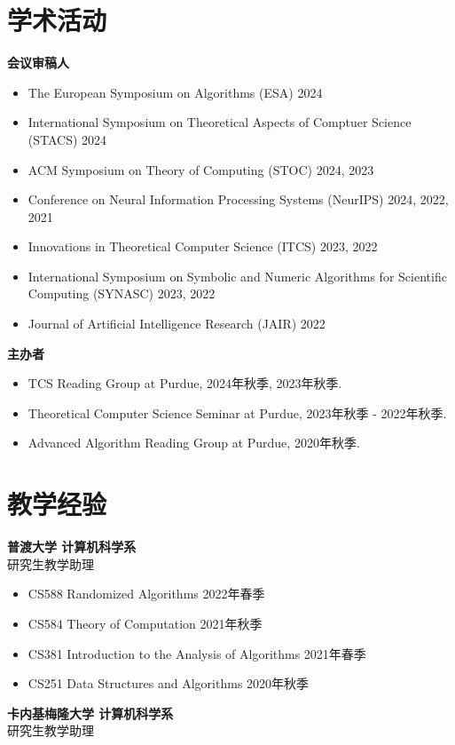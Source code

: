 \documentclass[margin, 10pt]{res} %
\begin{document}
\begin{resume}
\section{学术活动}

{\bf 会议审稿人}

\begin{itemize}
\item The European Symposium on Algorithms (ESA) 2024
\item International Symposium on Theoretical Aspects of Comptuer Science (STACS) 2024
\item ACM Symposium on Theory of Computing (STOC) 2024, 2023
\item Conference on Neural Information Processing Systems (NeurIPS) 2024, 2022, 2021
\item Innovations in Theoretical Computer Science (ITCS) 2023, 2022
\item International Symposium on Symbolic and Numeric Algorithms for Scientific Computing (SYNASC) 2023, 2022
\item Journal of Artificial Intelligence Research (JAIR) 2022
\end{itemize}
{\bf 主办者}

\begin{itemize}
\item TCS Reading Group at Purdue, 2024年秋季, 2023年秋季.
\item Theoretical Computer Science Seminar at Purdue, 2023年秋季 - 2022年秋季.
\item Advanced Algorithm Reading Group at Purdue, 2020年秋季.
\end{itemize}

\section{教学经验}

{\bf 普渡大学 计算机科学系}\\
研究生教学助理

\begin{itemize}
\item CS588 Randomized Algorithms \hfill 2022年春季
\item CS584 Theory of Computation \hfill 2021年秋季
\item CS381 Introduction to the Analysis of Algorithms \hfill 2021年春季
\item CS251 Data Structures and Algorithms \hfill 2020年秋季
\end{itemize}
{\bf 卡内基梅隆大学 计算机科学系}\\
研究生教学助理


\end{resume}
\end{document}
